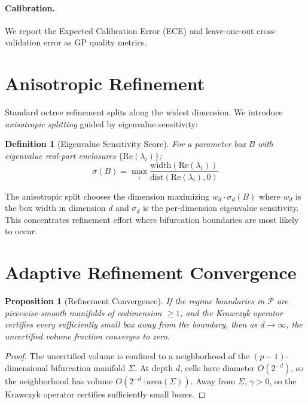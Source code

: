 \documentclass[11pt]{article}
\newtheorem{proposition}[theorem]{Proposition}
\newtheorem{definition}[theorem]{Definition}
\begin{document}
\paragraph{Calibration.}
We report the Expected Calibration Error (ECE) and leave-one-out cross-validation error as GP quality metrics.

\section{Anisotropic Refinement}
\label{sec:anisotropic}

Standard octree refinement splits along the widest dimension.
We introduce \emph{anisotropic splitting} guided by eigenvalue sensitivity:

\begin{definition}[Eigenvalue Sensitivity Score]
For a parameter box $B$ with eigenvalue real-part enclosures $\{\mathrm{Re}(\lambda_i)\}$:
\[
\sigma(B) = \max_i \frac{\mathrm{width}(\mathrm{Re}(\lambda_i))}{\mathrm{dist}(\mathrm{Re}(\lambda_i), 0)}
\]
\end{definition}

The anisotropic split chooses the dimension maximizing $w_d \cdot \sigma_d(B)$ where $w_d$ is the box width in dimension $d$ and $\sigma_d$ is the per-dimension eigenvalue sensitivity.
This concentrates refinement effort where bifurcation boundaries are most likely to occur.

\section{Adaptive Refinement Convergence}
\label{sec:convergence}

\begin{proposition}[Refinement Convergence]
\label{prop:convergence}
If the regime boundaries in $\mathcal{P}$ are piecewise-smooth manifolds of codimension $\geq 1$, and the Krawczyk operator certifies every sufficiently small box away from the boundary, then as $d \to \infty$, the uncertified volume fraction converges to zero.
\end{proposition}

\begin{proof}
The uncertified volume is confined to a neighborhood of the $(p{-}1)$-dimensional bifurcation manifold $\Sigma$.
At depth $d$, cells have diameter $O(2^{-d})$, so the neighborhood has volume $O(2^{-d} \cdot \mathrm{area}(\Sigma))$.
Away from $\Sigma$, $\gamma > 0$, so the Krawczyk operator certifies sufficiently small boxes.
\end{proof}
\end{document}
